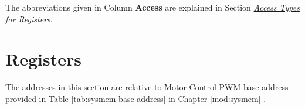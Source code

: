 \documentclass[main\_\_EN.tex]{subfiles}
\begin{document}
The abbreviations given in Column \textbf{Access} are explained in Section \hyperref[glossary-access-types]{\textit{Access Types for Registers}}.






\clearpage
\section{Registers}

The addresses in this section are relative to Motor Control PWM base address provided in Table \ref{tab:sysmem-base-address} in Chapter \ref{mod:sysmem} \textit{}.


\end{document}

